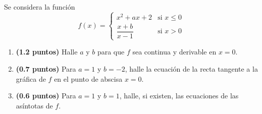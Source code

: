 
Se considera la función
\[
f(x)=\begin{cases}
x^2+ax+2 & \text{si }x\leq 0\\
\dfrac{x+b}{x-1} & \text{si }x>0
\end{cases}
\]
\begin{enumerate}[label=\alph*)]
  \item \textbf{(1.2 puntos)} Halle $a$ y $b$ para que $f$ sea continua
  y derivable en $x=0$.
  \item \textbf{(0.7 puntos)} Para $a=1$ y $b=-2$, halle la ecuación de la
  recta tangente a la gráfica de $f$ en el punto de abscisa $x=0$.
  \item \textbf{(0.6 puntos)} Para $a=1$ y $b=1$, halle, si existen, las
  ecuaciones de las asíntotas de $f$.
\end{enumerate}

